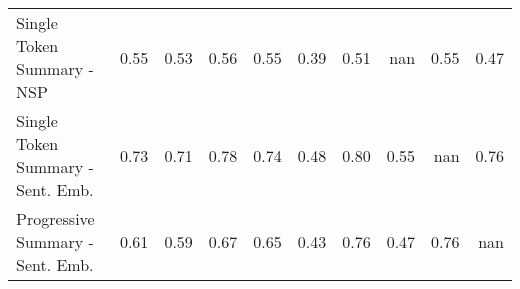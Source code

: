 \begin{tabular}{lrrrrrrrrr}
Single Token Summary - NSP & \cellcolor[RGB]{151,184,254}0.55 & \cellcolor[RGB]{142,177,253}0.53 & \cellcolor[RGB]{159,190,254}0.56 & \cellcolor[RGB]{152,185,254}0.55 & \cellcolor[RGB]{58,76,192}0.39 & \cellcolor[RGB]{130,165,251}0.51 & \cellcolor[RGB]{0,0,0}nan & \cellcolor[RGB]{153,186,254}0.55 & \cellcolor[RGB]{103,136,237}0.47 \\
Single Token Summary - Sent. Emb. & \cellcolor[RGB]{243,198,176}0.73 & \cellcolor[RGB]{237,208,193}0.71 & \cellcolor[RGB]{247,174,145}0.78 & \cellcolor[RGB]{244,194,170}0.74 & \cellcolor[RGB]{107,141,240}0.48 & \cellcolor[RGB]{244,155,124}0.80 & \cellcolor[RGB]{153,186,254}0.55 & \cellcolor[RGB]{0,0,0}nan & \cellcolor[RGB]{246,185,157}0.76 \\
Progressive Summary - Sent. Emb. & \cellcolor[RGB]{192,211,245}0.61 & \cellcolor[RGB]{178,203,251}0.59 & \cellcolor[RGB]{220,220,221}0.67 & \cellcolor[RGB]{208,218,233}0.65 & \cellcolor[RGB]{77,103,215}0.43 & \cellcolor[RGB]{246,182,154}0.76 & \cellcolor[RGB]{103,136,237}0.47 & \cellcolor[RGB]{246,185,157}0.76 & \cellcolor[RGB]{0,0,0}nan \\
\bottomrule
\end{tabular}